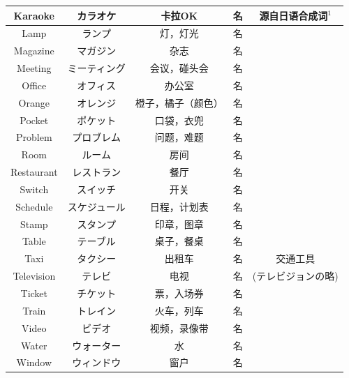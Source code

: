 \begin{longtable}{|c|c|c|c|c|}
    Karaoke & カラオケ & 卡拉OK & 名 & 源自日语合成词${}^{1}$ \\ \hline
    
    Lamp & ランプ & 灯，灯光 & 名 & \\ \hline
    
    Magazine & マガジン & 杂志 & 名 & \\ \hline
    Meeting & ミーティング & 会议，碰头会 & 名 & \\ \hline
    
    Office & オフィス & 办公室 & 名 & \\ \hline
    Orange & オレンジ & 橙子，橘子（颜色） & 名 & \\ \hline
    
    Pocket & ポケット & 口袋，衣兜 & 名 & \\ \hline
    Problem & プロブレム & 问题，难题 & 名 & \\ \hline
    
    Room & ルーム & 房间 & 名 & \\ \hline
    Restaurant & レストラン & 餐厅 & 名 & \\ \hline
    
    Switch & スイッチ & 开关 & 名 & \\ \hline
    Schedule & スケジュール & 日程，计划表 & 名 & \\ \hline
    Stamp & スタンプ & 印章，图章 & 名 & \\ \hline
    
    Table & テーブル & 桌子，餐桌 & 名 &  \\ \hline
    Taxi & タクシー & 出租车 & 名 & 交通工具 \\ \hline
    Television & テレビ & 电视 & 名 & (テレビジョンの略) \\ \hline
    Ticket & チケット & 票，入场券 & 名 & \\ \hline
    Train & トレイン & 火车，列车 & 名 & \\ \hline
    
    Video & ビデオ & 视频，录像带 & 名 & \\ \hline
    
    Water & ウォーター & 水 & 名 & \\ \hline
    Window & ウィンドウ & 窗户 & 名 & \\ \hline
\end{longtable}

